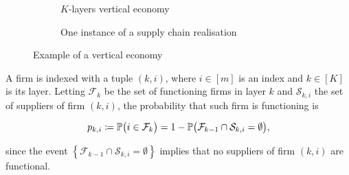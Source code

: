 \documentclass[../../main.tex]{subfiles}
\begin{document}
\begin{figure}[H]
  \centering
  \begin{subfigure}{.5\textwidth}
    \centering
    \caption{$K$-layers vertical economy}
    \label{fig:vertical-economy-diagram}
  \end{subfigure}%
  \begin{subfigure}{.5\textwidth}
    \centering
    \caption{One instance of a supply chain realisation}
    \label{fig:vertical-economy-diagram:suppliers}
  \end{subfigure}
  \caption{Example of a vertical economy}
  \label{fig:gf}
\end{figure}


A firm is indexed with a tuple $(k, i)$, where $i \in [m]$ is an index and $k \in [K]$ is its layer. Letting $\mathcal{F}_k$ be the set of functioning firms in layer $k$ and $\mathcal{S}_{k, i}$ the set of suppliers of firm $(k, i)$, the probability that such firm is functioning is

\begin{equation} \label{eq:functional_probability}
  p_{k, i} \coloneqq \P\big( i \in \mathcal{F}_k \big) = 1 - \P\big( \mathcal{F}_{k - 1} \cap \mathcal{S}_{k, i} = \emptyset \big),
\end{equation}

since the event $\left\{ \mathcal{F}_{k - 1} \cap \mathcal{S}_{k, i} = \emptyset \right\}$ implies that no suppliers of firm $(k, i)$ are functional.
\end{document}
